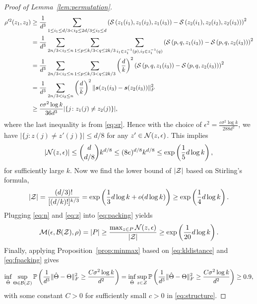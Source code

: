\documentclass[11pt]{article}
\theoremstyle{definition}
\begin{document}
\begin{proof}[Proof of Lemma~\ref{lem:permutation}]
\begin{align}
    \rho'^2(z_1,z_2) &\geq \frac{1}{d^3}\sum_{1\leq i_1\leq d/3<i_2\leq 2d/3\leq i_3\leq d}\left( \mathcal{S}\left(z_1(i_1),z_1(i_2),z_1(i_3)\right)-\mathcal{S}\left(z_2(i_1),z_2(i_2),z_2(i_3)\right)\right)^2\\
    &= \frac{1}{d^3}\sum_{2n/3<i_3\leq n}\sum_{1\leq p \leq k/3< q\leq 2k/3}\sum_{i_1\in z_1^{-1}(p),i_2\in z_1^{-1}(q)}\left( \mathcal{S}\left(p,q,z_1(i_3)\right)-\mathcal{S}\left(p,q,z_2(i_3)\right)\right)^2\\&=
    \frac{1}{d^3}\sum_{2n/3<i_3\leq n}\sum_{1\leq p \leq k/3< q\leq 2k/3}\left(d\over k\right)^2\left( \mathcal{S}\left(p,q,z_1(i_3)\right)-\mathcal{S}\left(p,q,z_2(i_3)\right)\right)^2\\&=
    \frac{1}{d^3}\sum_{2n/3<i_3\leq n}\left(d\over k\right)^2\lVert\bm{s}(z_1(i_3)-\bm{s}(z_2(i_3))\rVert_F^2
    \\&\geq  \frac{c\sigma^2\log k}{36d^3}|\{j\colon z_1(j)\neq z_2(j)\}|,
\end{align}where the last inequality is from \eqref{eq:sr}. Hence with the choice of $\epsilon^2 = \frac{c\sigma^2\log k}{288d^2}$, we have $|\{j\colon z(j)\neq z'(j)\}|\leq d/8$ for any $z'\in\mathcal{N}(z,\epsilon)$.
This implies
\begin{align}\label{eq:n}
    |\mathcal{N}(z,\epsilon)|\leq {d\choose d/8}k^{d/8}\leq (8e)^{d/8}k^{d/8}\leq \exp\left(\frac{1}{5}d\log k\right),
\end{align}
for sufficiently large $k$.
Now we find the lower bound of $|\mathcal{Z}|$ based on Stirling's formula,
\begin{align}\label{eq:z}
    |\mathcal{Z}| = \frac{(d/3)!}{[(d/k)!]^{k/3}} = \exp\left(\frac{1}{3}d\log k + o(d\log k)\right)\geq\exp\left(\frac{1}{4}d\log k\right).
\end{align}
Plugging \eqref{eq:n} and \eqref{eq:z} into \eqref{eq:packing} yields
\begin{align}\label{eq:fpacking}
    \mathcal{M}(\epsilon,\mathcal{B}(\mathcal{Z}),\rho) = |P| \geq\frac{\max_{z\in P}\mathcal{N}(z,\epsilon)}{|\mathcal{Z}|}\geq\exp\left(\frac{1}{20}d\log k\right).
\end{align}
Finally, applying Proposition~\ref{prop:minmax} based on  \eqref{eq:kldistance} and \eqref{eq:fpacking} gives
\begin{align}
    \inf_{\hat\Theta}\sup_{\Theta\in\mathcal{B}(\mathcal{Z})}\mathbb{P}\left(\frac{1}{d^3}\lVert\hat\Theta-\Theta\rVert_F^2\geq \frac{C\sigma^2\log k}{d^2}\right)=\inf_{\hat\Theta}\sup_{z\in\mathcal{Z}}\mathbb{P}\left(\frac{1}{d^3}\lVert\hat\Theta-\Theta\rVert_F^2\geq \frac{C\sigma^2\log k}{d^2}\right)\geq 0.9,
\end{align}
with some constant $C>0$ for sufficiently small $c>0$ in \eqref{eq:structure}.
\end{proof}
\end{document}
